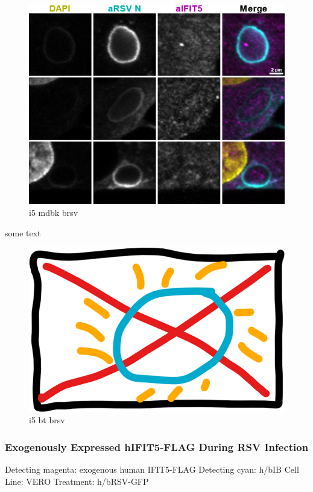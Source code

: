 \begin{figure}
    \centering
    \includegraphics[width=1\linewidth]{08. Chapter 3/Figs/05. IFIT5/04. mdbk brsv.png}
    \caption[i5 mdbk brsv]{i5 mdbk brsv}
    \label{i5 mdbk brsv}
\end{figure}

some text

\begin{figure}
    \centering
    \includegraphics[width=0.5\linewidth]{06. Chapter 1//Figs/00. placeholder.png}
    \caption[i5 bt brsv]{i5 bt brsv}
    \label{i5 bt brsv}
\end{figure}

\subsubsection{Exogenously Expressed hIFIT5-FLAG During RSV Infection} \label{Exogenously Expressed hIFIT5-FLAG During RSV Infection}
Detecting magenta: exogenous human IFIT5-FLAG \newline
Detecting cyan: h/bIB \newline
Cell Line: VERO \newline
Treatment: h/bRSV-GFP \newline

